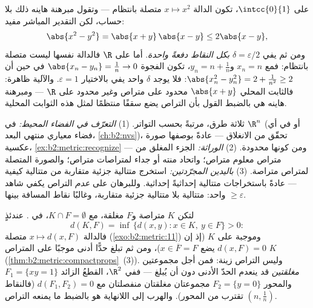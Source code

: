 \begin{example}\label{ex:b2:metric:heinework}
على $\intcc{0}{1}$، تكون الدالة $x \mapsto x^2$ متصلة بانتظام ---
وتقول مبرهنة هاينه ذلك بلا حساب، لكن التقدير المباشر
مفيد:
\[
\abs{x^2 - y^2} = \abs{x + y}\,\abs{x - y} \leq 2\abs{x - y},
\]
ومن ثم يفي $\delta = \varepsilon/2$ \emph{بكل النقاط
دفعةً واحدة}. أما على $\R$ فالدالة نفسها ليست متصلة بانتظام:
فمع $x_n = n$ و$y_n = n + \frac1n$، تكون الفجوة $\abs{x_n - y_n}
= \frac1n \to 0$ في حين أن $\abs{x_n^2 - y_n^2} = 2 + \frac1{n^2}
\geq 2$: فلا يوجد $\delta$ واحد يفي بالاختيار $\varepsilon = 1$. والآلية
ظاهرة: فالثابت  المحلي $\abs{x + y}$
محدود على متراص وغير محدود على $\R$ --- ومبرهنة
هاينه هي بالضبط القول بأن التراص يضع سقفًا منتظمًا
لمثل هذه الثوابت المحلية.
\end{example}

\begin{method}\label{met:b2:metric:compactness}
ثلاثة طرق، مرتبةً بحسب التواتر. (1) \emph{التعرّف في الفضاء
المحيط:} في $\R^n$ (أو في أي فضاء معياري منتهي البعد،
\cref{ch:b2:nvs})، تحقّق من الانغلاق --- عادةً بوصفها
صورة عكسية، \cref{ex:b2:metric:recognize} --- ومن كونها محدودة. (2)
\emph{الوراثة:} الجزء المغلق من متراص معلوم
متراص؛ واتحاد منته أو جداء لمتراصات متراص؛ والصورة
المتصلة لمتراص متراصة. (3) \emph{باليدين
المجرّدتين:} استخرج متتالية جزئية متقاربة من متتالية
كيفية --- عادةً باستخراجات متتالية إحداثيةً إحداثية.
وللبرهان على \emph{عدم} التراص يكفي شاهد واحد:
متتالية بلا متتالية جزئية متقاربة، وغالبًا
نقاط المسافة بينها $\geq \varepsilon$.
\end{method}

\begin{example}\label{ex:b2:metric:setdistance}
لتكن $K$ متراصة و$F$ مغلقة، مع $K \cap F = \emptyset$، في . عندئذٍ
\[
d(K, F) = \inf\,\{d(x, y) : x \in K,\ y \in F\} > 0 :
\]
فالدالة $x \mapsto d(x, F)$ متصلة
(\cref{exo:b2:metric:11}) وموجبة على $K$ (إذ إن $d(x, F) = 0$
يضع $x \in \overline F = F$)، ومن ثم تبلغ حدًّا أدنى موجبًا
على المتراص $K$
(\cref{thm:b2:metric:compactprops}~(3)). وليس التراص
زينة: فمن أجل مجموعتين \emph{مغلقتين} قد ينعدم الحدّ الأدنى
دون أن يُبلغ --- ففي $\R^2$، القطعُ الزائد $F_1 = \{xy
= 1\}$ والمحور $F_2 = \{y = 0\}$ مجموعتان مغلقتان منفصلتان
مع $d(F_1, F_2) = 0$ (فالنقاط $(n, \frac1n)$ تقترب من
المحور). والهرب إلى اللانهاية هو بالضبط ما يمنعه التراص.
\end{example}

